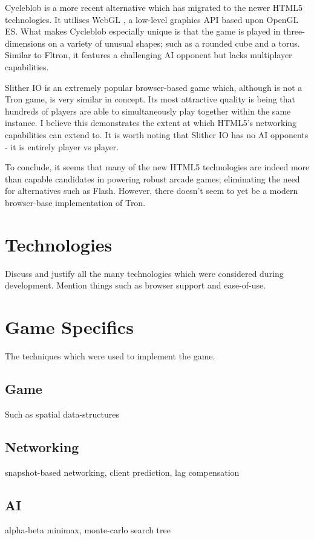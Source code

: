 \documentclass[class=article, crop=false]{standalone}
\begin{document}
		Cycleblob \parencite{Cycleblob} is a more recent alternative which has migrated to the newer HTML5 technologies. It utilises WebGL \parencite{WebGl}, a low-level graphics API based upon OpenGL ES. What makes Cycleblob especially unique is that the game is played in three-dimensions on a variety of unusual shapes; such as a rounded cube and a torus. Similar to Fltron, it features a challenging AI opponent but lacks multiplayer capabilities.

		Slither IO \parencite{SlitherIo} is an extremely popular browser-based game which, although is not a Tron game, is very similar in concept. Its most attractive quality is being that hundreds of players are able to simultaneously play together within the same instance. I believe this demonstrates the extent at which HTML5's networking capabilities can extend to. It is worth noting that Slither IO has no AI opponents - it is entirely player vs player.

		To conclude, it seems that many of the new HTML5 technologies are indeed more than capable candidates in powering robust arcade games; eliminating the need for alternatives such as Flash. However, there doesn't seem to yet be a modern browser-base implementation of Tron.

	\section{Technologies}
		Discuss and justify all the many technologies which were considered during development. Mention things such as browser support and ease-of-use.

	\section{Game Specifics}
		The techniques which were used to implement the game.

		\subsection{Game}
			Such as spatial data-structures

		\subsection{Networking}
			snapshot-based networking, client prediction, lag compensation

		\subsection{AI}
			alpha-beta minimax, monte-carlo search tree
\end{document}
